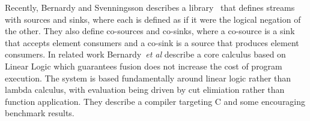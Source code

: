 Recently, Bernardy and Svenningsson describes a library~\cite{Bernardy:Duality} that defines streams with sources and sinks, where each is defined as if it were the logical negation of the other. They also define co-sources and co-sinks, where a co-source is a sink that accepts element consumers and a co-sink is a source that produces element consumers. In related work Bernardy~\emph{et al} describe a core calculus \cite{Bernardy:Composable} based on Linear Logic which guarantees fusion does not increase the cost of program execution. The system is based fundamentally around linear logic rather than lambda calculus, with evaluation being driven by cut elimiation rather than function application. They describe a compiler targeting C and some encouraging benchmark results.







